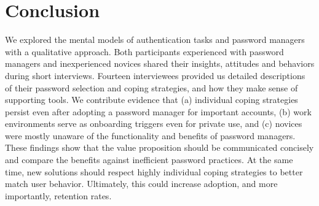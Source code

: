 \section{Conclusion}
We explored the mental models of authentication tasks and password managers with a qualitative approach. Both participants experienced with password managers and inexperienced novices shared their insights, attitudes and behaviors during short interviews. Fourteen interviewees provided us detailed descriptions of their password selection and coping strategies, and how they make sense of supporting tools. 
We contribute evidence that (a) individual coping strategies persist even after adopting a password manager for important accounts, (b) work environments serve as onboarding triggers even for private use, and (c) novices were mostly unaware of the functionality and benefits of password managers. 
These findings show that the value proposition should be communicated concisely and compare the benefits against inefficient password practices. At the same time, new solutions should respect highly individual coping strategies to better match user behavior. Ultimately, this could increase adoption, and more importantly, retention rates. 


\noindent
{}




